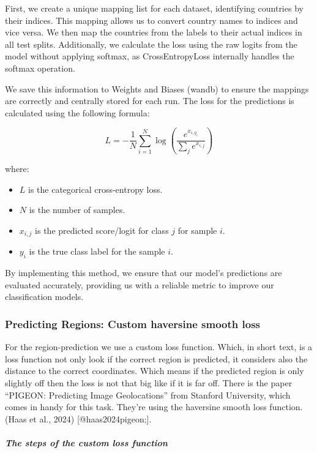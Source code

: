 \documentclass{article}
\providecommand{\tightlist}{%
  \setlength{\itemsep}{0pt}\setlength{\parskip}{0pt}}
\begin{document}
First, we create a unique mapping list for each dataset, identifying
countries by their indices. This mapping allows us to convert country
names to indices and vice versa. We then map the countries from the
labels to their actual indices in all test splits. Additionally, we
calculate the loss using the raw logits from the model without applying
softmax, as CrossEntropyLoss internally handles the softmax operation.

We save this information to Weights and Biases (wandb) to ensure the
mappings are correctly and centrally stored for each run. The loss for
the predictions is calculated using the following formula:

\[
L = -\frac{1}{N} \sum_{i=1}^{N} \log \left( \frac{e^{x_{i, y_i}}}{\sum_{j} e^{x_{i,j}}} \right)
\]

where:

\begin{itemize}
\tightlist
\item
  \(L\) is the categorical cross-entropy loss.
\item
  \(N\) is the number of samples.
\item
  \(x_{i,j}\) is the predicted score/logit for class \(j\) for sample
  \(i\).
\item
  \(y_i\) is the true class label for the sample \(i\).
\end{itemize}

By implementing this method, we ensure that our model's predictions are
evaluated accurately, providing us with a reliable metric to improve our
classification models.

\subsubsection{Predicting Regions: Custom haversine smooth
loss}\label{predicting-regions-custom-haversine-smooth-loss}

For the region-prediction we use a custom loss function. Which, in short
text, is a loss function not only look if the correct region is
predicted, it considers also the distance to the correct coordinates.
Which means if the predicted region is only slightly off then the loss
is not that big like if it is far off. There is the paper ``PIGEON:
Predicting Image Geolocations'' from Stanford University, which comes in
handy for this task. They're using the haversine smooth loss function.
(Haas et al., 2024) {[}@haas2024pigeon;{]}.

\subparagraph{The steps of the custom loss
function}\label{the-steps-of-the-custom-loss-function}
\end{document}

